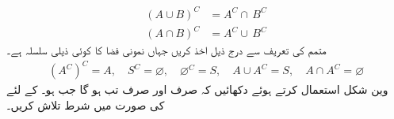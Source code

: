 \begin{align*}
(A\cup B)^C&=A^C\cap \,B^C\\
(A\cap B)^C&=A^C \cup \,B^C
\end{align*}
\quad
متمم کی تعریف سے درج ذیل اخذ کریں جہاں نمونی فضا  کا  کوئی ذیلی سلسلہ ہے۔
\begin{align*}
(A^C)^C=A,\quad S^C=\varnothing,\quad \varnothing^C=S,\quad A\cup A^C=S,\quad A\cap A^C=\varnothing
\end{align*}
\quad
وین شکل استعمال کرتے ہوئے دکھائیں کہ  صرف اور صرف تب ہو گا جب  ہو۔ کے لئے  کی صورت میں شرط تلاش کریں۔

